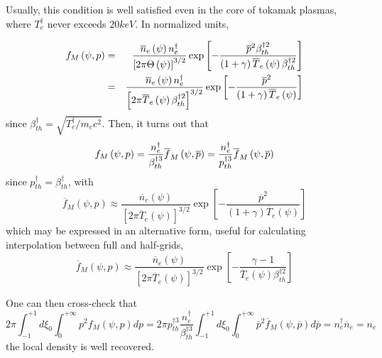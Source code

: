 Usually, this condition is well satisfied even in the core of tokamak
plasmas, where $T_{e}^{\dag }$ never exceeds $20keV.$ In normalized units,

\begin{eqnarray}
f_{M}\left( \psi ,p\right) &=&\frac{\overline{n}_{e}\left( \psi \right)
n_{e}^{\dag }}{\left[ 2\pi \Theta \left( \psi \right) \right] ^{3/2}}\exp %
\left[ -\frac{\overline{p}^{2}\beta _{th}^{\dag 2}}{\left( 1+\gamma \right) 
\overline{T}_{e}\left( \psi \right) \beta _{th}^{\dag 2}}\right]  \notag \\
&=&\frac{\overline{n}_{e}\left( \psi \right) n_{e}^{\dag }}{\left[ 2\pi 
\overline{T}_{e}\left( \psi \right) \beta _{th}^{\dag 2}\right] ^{3/2}}\exp %
\left[ -\frac{\overline{p}^{2}}{\left( 1+\gamma \right) \overline{T}%
_{e}\left( \psi \right) }\right]
\end{eqnarray}
since $\beta _{th}^{\dag }=\sqrt{T_{e}^{\dag }/m_{e}c^{2}}.$ Then, it turns
out that 
\begin{equation}
f_{M}\left( \psi ,p\right) =\frac{n_{e}^{\dag }}{\beta _{th}^{\dag 3}}%
\overline{f}_{M}\left( \psi ,\overline{p}\right) =\frac{n_{e}^{\dag }}{%
p_{th}^{\dag 3}}\overline{f}_{M}\left( \psi ,\overline{p}\right)
\end{equation}
since $p_{th}^{\dag }=\beta _{th}^{\dag }$, with 
\begin{equation}
\overline{f}_{M}\left( \psi ,p\right) \approx \frac{\overline{n}_{e}\left(
\psi \right) }{\left[ 2\pi \overline{T}_{e}\left( \psi \right) \right] ^{3/2}%
}\exp \left[ -\frac{\overline{p}^{2}}{\left( 1+\gamma \right) \overline{T}%
_{e}\left( \psi \right) }\right]
\end{equation}
which may be expressed in an alternative form, useful for calculating
interpolation between full and half-grids, 
\begin{equation}
\overline{f}_{M}\left( \psi ,p\right) \approx \frac{\overline{n}_{e}\left(
\psi \right) }{\left[ 2\pi \overline{T}_{e}\left( \psi \right) \right] ^{3/2}%
}\exp \left[ -\frac{\gamma -1}{\overline{T}_{e}\left( \psi \right) \beta
_{th}^{\dag 2}}\right]
\end{equation}

One can then cross-check that 
\begin{equation}
2\pi \int_{-1}^{+1}d\xi _{0}\int_{0}^{+\infty }p^{2}f_{M}\left( \psi
,p\right) dp=2\pi p_{th}^{\dag 3}\frac{n_{e}^{\dag }}{\beta _{th}^{\dag 3}}%
\int_{-1}^{+1}d\xi _{0}\int_{0}^{+\infty }\overline{p}^{2}\overline{f}%
_{M}\left( \psi ,\overline{p}\right) d\overline{p}=n_{e}^{\dag }\overline{n}%
_{e}=n_{e}
\end{equation}
the local density is well recovered$.$

